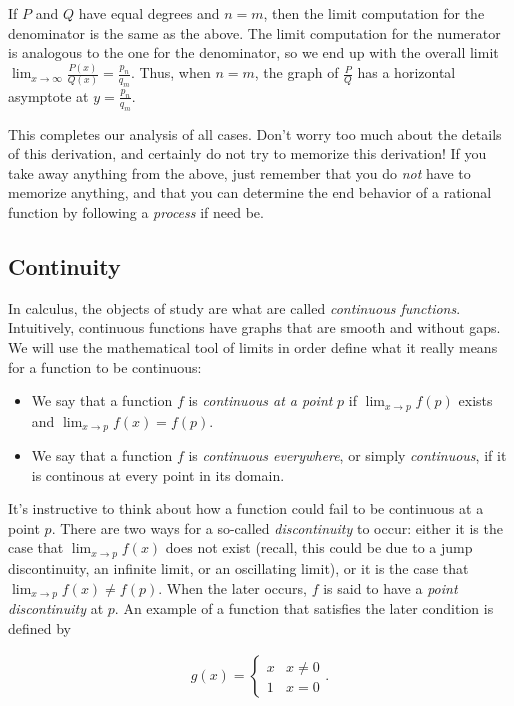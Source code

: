 \documentclass{article}
\begin{document}
If $P$ and $Q$ have equal degrees and $n = m$, then the limit computation for the denominator is the same as the above. The limit computation for the numerator is analogous to the one for the denominator, so we end up with the overall limit $\lim_{x \rightarrow \infty} \frac{P(x)}{Q(x)} = \frac{p_n}{q_m}$. Thus, when $n = m$, the graph of $\frac{P}{Q}$ has a horizontal asymptote at $y = \frac{p_n}{q_m}$. 

This completes our analysis of all cases. Don't worry too much about the details of this derivation, and certainly do not try to memorize this derivation! If you take away anything from the above, just remember that you do \textit{not} have to memorize anything, and that you can determine the end behavior of a rational function by following a \textit{process} if need be. 

\subsection*{Continuity}

In calculus, the objects of study are what are called \textit{continuous functions}. Intuitively, continuous functions have graphs that are smooth and without gaps. We will use the mathematical tool of limits in order define what it really means for a function to be continuous:

\begin{itemize}
    \item We say that a function $f$ is \textit{continuous at a point} $p$ if $\lim_{x \rightarrow p} f(p)$ exists and $\lim_{x \rightarrow p} f(x) = f(p)$. 
    \item We say that a function $f$ is \textit{continuous everywhere}, or simply \textit{continuous}, if it is continous at every point in its domain.
\end{itemize}

It's instructive to think about how a function could fail to be continuous at a point $p$. There are two ways for a so-called \textit{discontinuity} to occur: either it is the case that $\lim_{x \rightarrow p} f(x)$ does not exist (recall, this could be due to a jump discontinuity, an infinite limit, or an oscillating limit), or it is the case that $\lim_{x \rightarrow p} f(x) \neq f(p)$. When the later occurs, $f$ is said to have a \textit{point discontinuity} at $p$. An example of a function that satisfies the later condition is defined by

\begin{align*}
    g(x) =
    \begin{cases}
        x & x \neq 0 \\
        1 & x = 0
    \end{cases}.
\end{align*}
\end{document}
